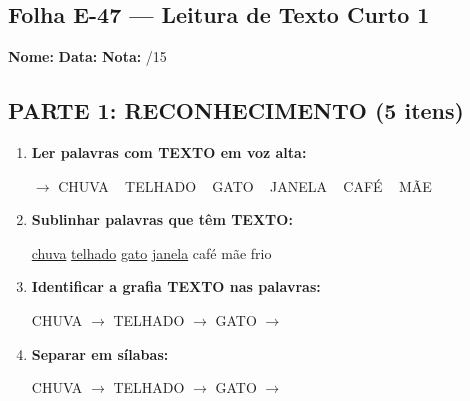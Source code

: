 \subsection{Folha E-47 --- Leitura de Texto Curto 1}
\begin{exercicio}



\noindent\textbf{Nome:} \underline{\hspace{3.2cm}} \quad \textbf{Data:} \underline{\hspace{1.6cm}} \quad \textbf{Nota:} \underline{\hspace{0.9cm}}/15


\subsection*{PARTE 1: RECONHECIMENTO (5 itens)}

\begin{enumerate}

  \item \textbf{Ler palavras com TEXTO em voz alta:}
  \begin{center}
  $\rightarrow$ CHUVA ~ TELHADO ~ GATO ~ JANELA ~ CAFÉ ~ MÃE
  \end{center}

  \item \textbf{Sublinhar palavras que têm TEXTO:}

\begin{center}
  \uline{chuva} \quad \uline{telhado} \quad \uline{gato} \quad \uline{janela} \quad café \quad mãe \quad frio
\end{center}

  \item \textbf{Identificar a grafia TEXTO nas palavras:}
  \begin{center}
  CHUVA $\rightarrow$ \underline{\hspace{1cm}} \quad TELHADO $\rightarrow$ \underline{\hspace{1cm}} \quad GATO $\rightarrow$ \underline{\hspace{1cm}}
  \end{center}

  \item \textbf{Separar em sílabas:}
  \begin{center}
  CHUVA $\rightarrow$ \underline{\hspace{1.2cm}} \quad TELHADO $\rightarrow$ \underline{\hspace{1.2cm}} \quad GATO $\rightarrow$ \underline{\hspace{1.2cm}}
  \end{center}


\end{enumerate}
\end{exercicio}
